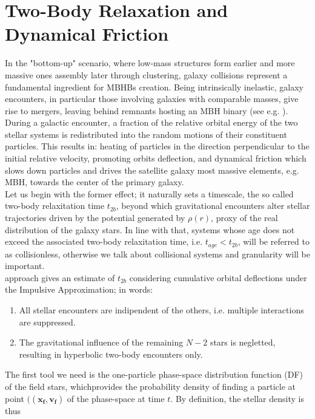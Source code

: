 \documentclass[12pt,twoside,openany]{book}
\begin{document}
\newpage








\section{Two-Body Relaxation and Dynamical Friction}
In the "bottom-up" scenario, where low-mass structures form earlier and more massive ones assembly later through clustering, galaxy collisions represent a fundamental ingredient for MBHBs creation. Being intrinsically inelastic, galaxy encounters, in particular those involving galaxies with comparable masses, give rise to mergers, leaving behind remnants hosting an MBH binary (see e.g. \textcite{Baumgardt_2006}).\\During a galactic encounter, a fraction of the relative orbital energy of the two stellar systems is redistributed into the random motions of their constituent particles. This results in: heating of particles in the direction perpendicular to the initial relative velocity, promoting orbits deflection, and dynamical friction which slows down particles and drives the satellite galaxy most massive elements, e.g. MBH, towards the center of the primary galaxy.\\Let us begin with the former effect; it naturally sets a timescale, the so called  two-body relaxitation time $t_{2b}$, beyond which gravitational encounters alter stellar trajectories driven by the potential generated by $\rho(r)$, proxy of the real distribution of the galaxy stars. In line with that, systems whose age does not exceed the associated two-body relaxitation time, i.e. $t_{age}<t_{2b}$, will be referred to as collisionless, otherwise  we talk about collisional systems and granularity will be important.\\\textcite{Chandrasekhar_1943} approach gives an estimate of $t_{2b}$ considering cumulative orbital deflections under the Impulsive Approximation; in words:
\begin{enumerate}
    \item   All stellar encounters are indipendent of the others, i.e. multiple interactions are suppressed.
    \item  The gravitational influence of the remaining $N-2$ stars is negletted, resulting in hyperbolic two-body encounters only.
\end{enumerate}
The first tool we need is the one-particle phase-space distribution function (DF) of the field stars, whichprovides the probability density of finding a particle at point $((\mathbf{x_f},\mathbf{v_f})$ of the phase-space at time $t$. By definition, the stellar density is thus
\end{document}
